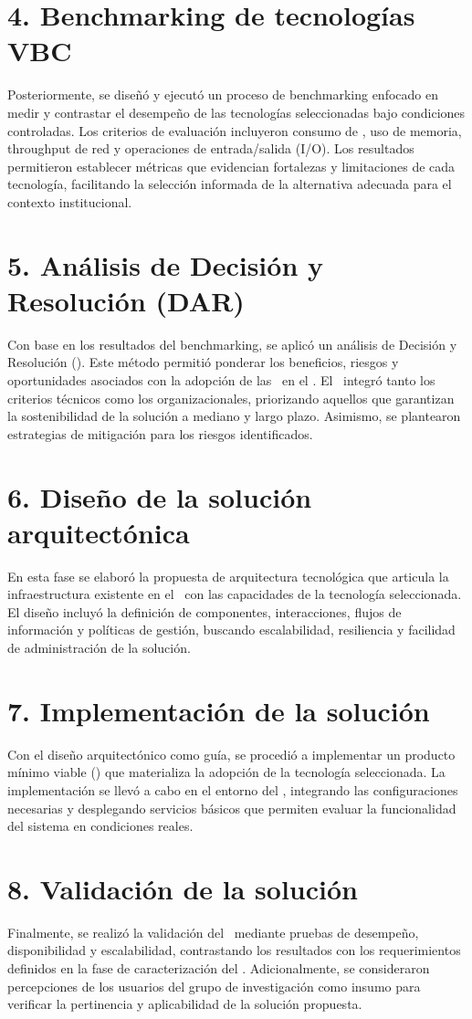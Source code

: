 \section*{4. Benchmarking de tecnologías VBC}
Posteriormente, se diseñó y ejecutó un proceso de benchmarking enfocado en medir y contrastar el desempeño de las tecnologías seleccionadas bajo condiciones controladas. Los criterios de evaluación incluyeron consumo de \CPU, uso de memoria, throughput de red y operaciones de entrada/salida (I/O). Los resultados permitieron establecer métricas que evidencian fortalezas y limitaciones de cada tecnología, facilitando la selección informada de la alternativa adecuada para el contexto institucional.

\section*{5. Análisis de Decisión y Resolución (DAR)}
Con base en los resultados del benchmarking, se aplicó un análisis de Decisión y Resolución (\DAR). Este método permitió ponderar los beneficios, riesgos y oportunidades asociados con la adopción de las \VBC\ en el \GRID. El \DAR\ integró tanto los criterios técnicos como los organizacionales, priorizando aquellos que garantizan la sostenibilidad de la solución a mediano y largo plazo. Asimismo, se plantearon estrategias de mitigación para los riesgos identificados.

\section*{6. Diseño de la solución arquitectónica}
En esta fase se elaboró la propuesta de arquitectura tecnológica que articula la infraestructura existente en el \GRID\ con las capacidades de la tecnología seleccionada. El diseño incluyó la definición de componentes, interacciones, flujos de información y políticas de gestión, buscando escalabilidad, resiliencia y facilidad de administración de la solución.

\section*{7. Implementación de la solución}
Con el diseño arquitectónico como guía, se procedió a implementar un producto mínimo viable (\PMV) que materializa la adopción de la tecnología seleccionada. La implementación se llevó a cabo en el entorno del \GRID, integrando las configuraciones necesarias y desplegando servicios básicos que permiten evaluar la funcionalidad del sistema en condiciones reales.

\section*{8. Validación de la solución}
Finalmente, se realizó la validación del \PMV\ mediante pruebas de desempeño, disponibilidad y escalabilidad, contrastando los resultados con los requerimientos definidos en la fase de caracterización del \GRID. Adicionalmente, se consideraron percepciones de los usuarios del grupo de investigación como insumo para verificar la pertinencia y aplicabilidad de la solución propuesta.